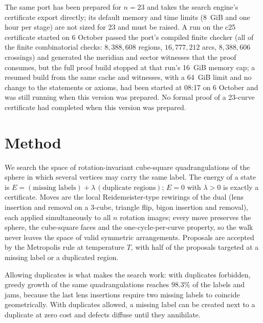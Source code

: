 \documentclass[11pt]{article}
\begin{document}
The same port has been prepared for $n=23$ and takes the search engine's certificate export directly; its default
memory and time limits (8~GiB and one hour per stage) are not sized for 23 and must be raised. A run on the c25
certificate started on 6 October passed the port's compiled finite checker (all of the finite combinatorial checks:
$8{,}388{,}608$ regions, $16{,}777{,}212$ arcs, $8{,}388{,}606$ crossings) and generated the meridian and sector
witnesses that the proof consumes, but the full proof build stopped at that run's 16~GiB memory cap; a resumed build
from the same cache and witnesses, with a 64~GiB limit and no change to the statements or axioms, had been started
at 08:17 on 6 October and was still running when this version was prepared.
No formal proof of a 23-curve certificate had completed when this version was prepared.

\section{Method}\label{sec:method}
We search the space of rotation-invariant cube-square quadrangulations of the sphere in which several vertices may
carry the same label. The energy of a state is $E = (\text{missing labels}) + \lambda\,(\text{duplicate regions})$;
$E=0$ with $\lambda>0$ is exactly a certificate. Moves are the local Reidemeister-type rewirings of the dual (lens
insertion and removal on a 3-cube, triangle flip, bigon insertion and removal), each applied simultaneously to all $n$
rotation images; every move preserves the sphere, the cube-square faces and the one-cycle-per-curve property, so the
walk never leaves the space of valid symmetric arrangements. Proposals are accepted by the Metropolis rule at
temperature $T$, with half of the proposals targeted at a missing label or a duplicated region.

Allowing duplicates is what makes the search work: with duplicates forbidden, greedy growth of the same
quadrangulations reaches $98.3\%$ of the labels and jams, because the last lens insertions require two missing labels
to coincide geometrically. With duplicates allowed, a missing label can be created next to a duplicate at zero cost and
defects diffuse until they annihilate.
\end{document}
